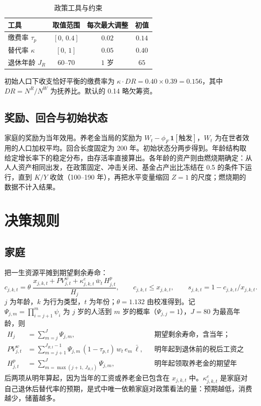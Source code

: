 \documentclass[UTF8,11pt,a4paper]{ctexart}
\begin{document}
\begin{table}[H]
\centering\small
\caption{政策工具与约束}\label{tab:policy}
\begin{tabular}{lccc}
\toprule
工具 & 取值范围 & 每次最大调整 & 初值 \\
\midrule
缴费率 $\tau_p$ & $[0,\,0.4]$ & $0.02$ & $0.14$ \\
替代率 $\kappa$ & $[0,\,1]$ & $0.05$ & $0.40$ \\
退休年龄 $J_R$ & $60$--$70$ & $1$ 岁 & $65$ \\
\bottomrule
\end{tabular}
\end{table}

初始人口下收支恰好平衡的缴费率为 $\kappa\cdot DR = 0.40\times 0.39 = 0.156$，其中 $DR=N^R/N^W$ 为抚养比。默认的 0.14 略欠筹资。

\subsection{奖励、回合与初始状态}

家庭的奖励为当年效用。养老金当局的奖励为 $W_t - \phi_F\,\mathbf{1}[\text{触发}]$，$W_t$ 为在世者效用的人口加权平均。回合长度固定为 200 年。初始状态分两步得到。年龄结构取给定增长率下的稳定分布，由存活率直接算出。各年龄的资产则由燃烧期确定：从人人资产相同出发，在政策固定、冲击关闭、基金占产出比冻结在 0.5 的条件下运行，直到 $K/Y$ 收敛（100--190 年），再把水平变量缩回 $Z=1$ 的尺度；燃烧期的数据不计入结果。

\section{决策规则}

\subsection{家庭}

把一生资源平摊到期望剩余寿命：
\begin{equation}\label{eq:rule}
  c_{j,k,t} = \theta\;\frac{x_{j,k,t} + PV^{w}_{j,t} + \kappa^{e}_{j,k,t}\,\bar w_t\, H^{p}_{j,t}}{H_{j}}, \qquad c_{j,k,t} \le x_{j,k,t} ,\qquad s_{j,k,t} = 1 - c_{j,k,t}/x_{j,k,t} .
\end{equation}
$j$ 为年龄，$k$ 为行为类型，$t$ 为年份；$\theta=1.132$ 由校准得到。记 $\Psi_{j,m}=\prod_{i=j+1}^{m}\psi_i$ 为 $j$ 岁的人活到 $m$ 岁的概率（$\Psi_{j,j}=1$），$J=80$ 为最高年龄，则
\begin{align}
  H_{j} &= \sum_{m=j}^{J}\Psi_{j,m}, && \text{期望剩余寿命，含当年；}\\
  PV^{w}_{j,t} &= \sum_{m=j+1}^{J_{R,t}-1}\Psi_{j,m}\,(1-\tau_{p,t})\,w_t\,e_m\,\bar\ell, && \text{明年起到退休前的税后工资之和；}\\
  H^{p}_{j,t} &= \sum_{m=\max(j+1,\,J_{R,t})}^{J}\Psi_{j,m}, && \text{明年起领取养老金的期望年数。}
\end{align}
后两项从明年算起，因为当年的工资或养老金已包含在 $x_{j,k,t}$ 中。$\kappa^e_{j,k,t}$ 是家庭对自己退休后替代率的预期，是式中唯一依赖家庭对政策看法的量：预期越低，消费越少，储蓄越多。
\end{document}
